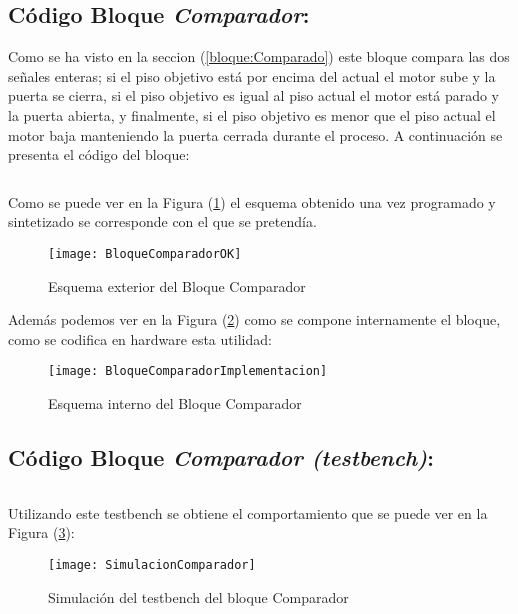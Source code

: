 \subsection{Código Bloque \textit{Comparador}:} \label{code:Comparador}
	Como se ha visto en la seccion (\ref{bloque:Comparado}) este bloque compara las dos señales enteras; si el piso objetivo está por encima del actual el motor sube y la puerta se cierra, si el piso objetivo es igual al piso actual el motor está parado y la puerta abierta, y finalmente, si el piso objetivo es menor que el piso actual el motor baja manteniendo la puerta cerrada durante el proceso. A continuación se presenta el código del bloque: \\ 

    \inputminted[frame=lines,fontsize=\footnotesize,linenos]{vhdl}{CodeFiles/Comparador.vhd}	

	Como se puede ver en la Figura (\ref{fig:BloqueComparadorOK}) el esquema obtenido una vez programado y sintetizado se corresponde con el que se pretendía.
    \begin{figure}[H]
		    \centering
		    \texttt{[image: BloqueComparadorOK]}
		    \caption{Esquema exterior del Bloque Comparador}
		    \label{fig:BloqueComparadorOK}
	\end{figure}
    Además podemos ver en la Figura (\ref{fig:BloqueComparadorImplementacion}) como se compone internamente el bloque, como se codifica en hardware esta utilidad:
    \begin{figure}[H]
		    \centering
		    \texttt{[image: BloqueComparadorImplementacion]}
		    \caption{Esquema interno del Bloque Comparador}
		    \label{fig:BloqueComparadorImplementacion}
	\end{figure}

\subsection{Código Bloque \textit{Comparador (testbench)}:} \label{code:Comparador_tb}
    \inputminted[frame=lines,fontsize=\footnotesize,linenos]{vhdl}{CodeFiles/Comparador_tb.vhd}

    Utilizando este testbench se obtiene el comportamiento que se puede ver en la Figura (\ref{fig:SimulacionComparador}):

    \begin{figure}[H]
		    \centering
		    \texttt{[image: SimulacionComparador]}
		    \caption{Simulación del testbench del bloque Comparador}
		    \label{fig:SimulacionComparador}
	\end{figure}

